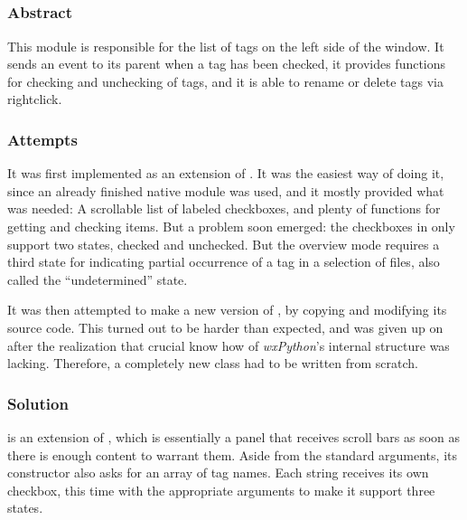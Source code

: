 \subsection{}
\def\kapitelautor{Erik Ritschl}
\label{subsec:mod:taglist}


\subsubsection{Abstract}

This module is responsible for the list of tags on the left side of the window.
It sends an event to its parent  when a tag has been
checked, it provides functions for checking and unchecking of tags, and it is
able to rename or delete tags via rightclick.

\subsubsection{Attempts}

It was first implemented as an extension of  \cite{wxCheckListBox}. It was
the easiest way of doing it, since an already finished native module was used,
and it mostly provided what was needed: A scrollable list of labeled
checkboxes, and plenty of functions for getting and checking items. But a
problem soon emerged: the checkboxes in  only support
two states, checked and unchecked. But the overview mode requires a third state
for indicating partial occurrence of a tag in a selection of files, also called
the ``undetermined'' state.

It was then attempted to make a new version of , by
copying and modifying its source code. This turned out to be harder than
expected, and was given up on after the realization that crucial know how of
\emph{wxPython}'s internal structure was lacking. Therefore, a
completely new class had to be written from scratch.

\subsubsection{Solution}

 is an extension of  \cite{wxScrolledWindow}, which is
essentially a panel that receives scroll bars as soon as there is enough
content to warrant them. Aside from the standard arguments, its constructor
also asks for an array of tag names. Each string receives its own checkbox,
this time with the appropriate arguments to make it support three states.

